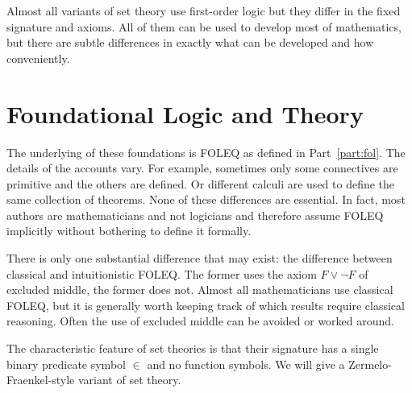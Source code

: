 Almost all variants of set theory use first-order logic but they differ in the fixed signature and axioms. All of them can be used to develop most of mathematics, but there are subtle differences in exactly what can be developed and how conveniently.

\section{Foundational Logic and Theory}

The underlying of these foundations is FOLEQ as defined in Part~\ref{part:fol}. The details of the accounts vary. For example, sometimes only some connectives are primitive and the others are defined. Or different calculi are used to define the same collection of theorems. None of these differences are essential. In fact, most authors are mathematicians and not logicians and therefore assume FOLEQ implicitly without bothering to define it formally.

There is only one substantial difference that may exist: the difference between classical and intuitionistic FOLEQ. The former uses the axiom $F\vee \neg F$ of excluded middle, the former does not. Almost all mathematicians use classical FOLEQ, but it is generally worth keeping track of which results require classical reasoning. Often the use of excluded middle can be avoided or worked around.

The characteristic feature of set theories is that their signature has a single binary predicate symbol $\in$ and no function symbols.
We will give a Zermelo-Fraenkel-style variant of set theory.

